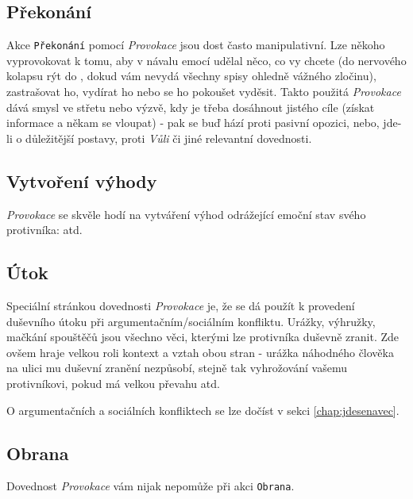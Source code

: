 \documentclass[../main.tex]{subfiles}
\begin{document}
\subsection*{Překonání}
\label{subsec:provokace-prekonani}
\prekonani

Akce \texttt{Překonání} pomocí \textit{Provokace} jsou dost často manipulativní. Lze někoho vyprovokovat k tomu, aby v návalu emocí udělal něco, co vy chcete (do nervového kolapsu rýt do , dokud vám nevydá všechny spisy ohledně vážného zločinu), zastrašovat ho, vydírat ho nebo se ho pokoušet vyděsit. Takto použitá \textit{Provokace} dává smysl ve střetu nebo výzvě, kdy je třeba dosáhnout jistého cíle (získat informace a někam se vloupat) - pak se buď hází proti pasivní opozici, nebo, jde-li o důležitější postavy, proti \textit{Vůli} či jiné relevantní dovednosti.


\subsection*{Vytvoření výhody}
\label{subsec:provokace-vytvoreni}
\vytvoreni

\textit{Provokace} se skvěle hodí na vytváření výhod odrážející emoční stav svého protivníka:  atd. 

\subsection*{Útok}
\label{subsec:provokace-utok}
\utok

Speciální stránkou dovednosti \textit{Provokace} je, že se dá použít k provedení duševního útoku při argumentačním/sociálním konfliktu. Urážky, výhružky, mačkání spouštěčů jsou všechno věci, kterými lze protivníka duševně zranit. Zde ovšem hraje velkou roli kontext a vztah obou stran - urážka náhodného člověka na ulici mu duševní zranění nezpůsobí, stejně tak vyhrožování vašemu protivníkovi, pokud má velkou převahu atd.

O argumentačních a sociálních konfliktech se lze dočíst v sekci \ref{chap:jdesenavec}.

\subsection*{Obrana}
\label{subsec:provokace-obrana}
\obrana

Dovednost \textit{Provokace} vám nijak nepomůže při akci \texttt{Obrana}.
\end{document}
